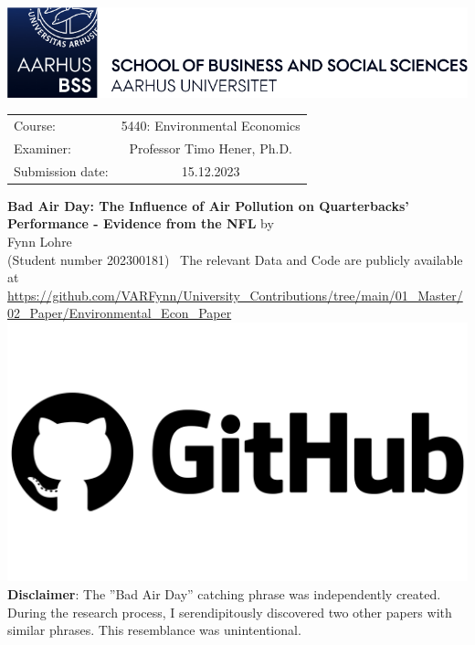 \documentclass[12pt,a4paper]{article}
\author{\myname}
\title{\mytitle}
\newcommand{\myname}{Fynn Lohre}
\newcommand{\mytitle}{Bad Air Day: The Influence of Air Pollution on Quarterbacks' Performance - Evidence from the NFL}
\newcommand{\myexaminer}{Professor Timo Hener, Ph.D. }
\newcommand{\mycourse}{5440: Environmental Economics}
\newcommand{\mysubmission}{15.12.2023}
\newcommand{\mymatr}{202300181}
\begin{document}
\begin{titlepage}
\center
\vfill
\includegraphics[scale=0.90]{BSS.png}
\vfill
\begin{tabular}[t]{lc}
Course:  & \mycourse \\
Examiner: & \myexaminer \\
Submission date: & \mysubmission \\
\end{tabular}
\vfill
{\large \textbf{\mytitle}}
\vfill
by \\ \vspace{3mm}
{\Large \myname}\\
(Student number \mymatr)\
\vfill
The relevant Data and Code are publicly available at \url{https://github.com/VARFynn/University_Contributions/tree/main/01_Master/02_Paper/Environmental_Econ_Paper}\\ 
\href{https://github.com/VARFynn/University_Contributions/tree/main/01_Master/02_Paper/Environmental_Econ_Paper}{\includegraphics[scale=0.015]{GitHub.png}}
\vfill 
\scriptsize \textbf{Disclaimer}: The ''Bad Air Day'' catching phrase was independently created. During the research process, I serendipitously discovered two other papers with similar phrases. This resemblance was unintentional.
\vfill
\thispagestyle{empty}
\pagebreak
\end{titlepage}

\newcounter{savepage}
\thispagestyle{empty}
\begin{abstract}
\textit{Insert Your Abstract here. } 
\end{abstract}
\clearpage
\end{document}
